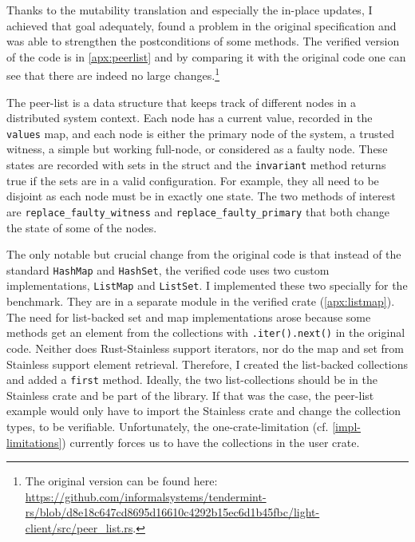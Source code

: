 Thanks to the mutability translation and especially the in-place updates, I
achieved that goal adequately, found a problem in the original specification and
was able to strengthen the postconditions of some methods. The verified version
of the code is in \autoref{apx:peerlist} and by comparing it with the original
code one can see that there are indeed no large changes.\footnote{The original
version can be found here:
\url{https://github.com/informalsystems/tendermint-rs/blob/d8e18c647cd8695d16610c4292b15ec6d1b45fbc/light-client/src/peer_list.rs}.}

The peer-list is a data structure that keeps track of different nodes in a
distributed system context. Each node has a current value, recorded in the
\lstinline!values! map, and each node is either the primary node of the system,
a trusted witness, a simple but working full-node, or considered as a faulty
node. These states are recorded with sets in the struct and the
\lstinline!invariant! method returns true if the sets are in a valid
configuration. For example, they all  need to be disjoint as each node must be
in exactly one state. The two methods of interest are
\lstinline!replace_faulty_witness! and \lstinline!replace_faulty_primary! that
both change the state of some of the nodes.

The only notable but crucial change from the original code is that instead of
the standard \lstinline!HashMap! and \lstinline!HashSet!, the verified code uses
two custom implementations, \lstinline!ListMap! and \lstinline!ListSet!. I
implemented these two specially for the benchmark. They are in a separate module
in the verified crate (\autoref{apx:listmap}). The need for list-backed set and
map implementations arose because some methods get an element from the
collections with \lstinline!.iter().next()! in the original code. Neither does
Rust-Stainless support iterators, nor do the map and set from Stainless support
element retrieval. Therefore, I created the list-backed collections and added a
\lstinline!first! method. Ideally, the two list-collections should be in the
Stainless crate and be part of the library. If that was the case, the peer-list
example would only have to import the Stainless crate and change  the collection
types, to be verifiable. Unfortunately, the one-crate-limitation (cf.
\autoref{impl-limitations}) currently forces us to have the collections in the
user crate.

